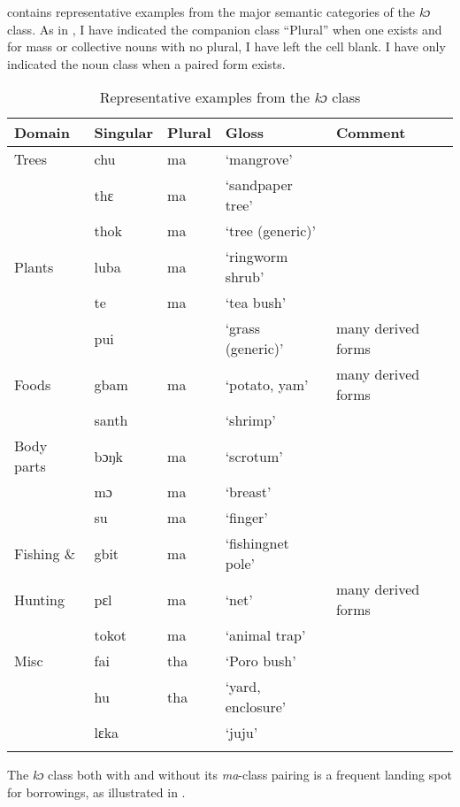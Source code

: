  contains representative examples from the major semantic categories of the \textit{kɔ} class. As in , I have indicated the companion class “Plural” when one exists and for mass or collective nouns with no plural, I have left the cell blank. I have only indicated the noun class when a paired form exists.

\begin{table}
\caption{\label{tab:nounclass:41}Representative examples from the \textit{kɔ} class}

\begin{tabularx}{\textwidth}{lllQl}
\lsptoprule
Domain & Singular & Plural & Gloss & Comment\\
\midrule
Trees & chu & ma & ‘mangrove' &\\
&  thɛ & ma & ‘sandpaper tree' &\\
& thok & ma & ‘tree (generic)' & \\
\tablevspace
Plants & luba & ma & ‘ringworm shrub' & \\
& te & ma & ‘tea bush' & \\
& pui &  & ‘grass (generic)' & many derived forms\\
\tablevspace
Foods & gbam & ma & ‘potato, yam' & many derived forms\\
& santh &  & ‘shrimp' & \\
\tablevspace
Body parts & bɔŋk & ma & ‘scrotum' & \\
& mɔ & ma & ‘breast' & \\
& su & ma & ‘finger' & \\
\tablevspace
Fishing \& & gbit & ma & ‘fishingnet pole' & \\
Hunting & pɛl & ma & ‘net' & many derived forms\\
& tokot & ma & ‘animal trap' & \\
\tablevspace
Misc & fai & tha & ‘Poro bush' & \\
& hu & tha & ‘yard, enclosure' & \\
& lɛka &  & ‘juju' & \\

\lspbottomrule
\end{tabularx}
\end{table}

The \textit{kɔ} class both with and without its \textit{ma}{}-class pairing is a frequent landing spot for borrowings, as illustrated in .

